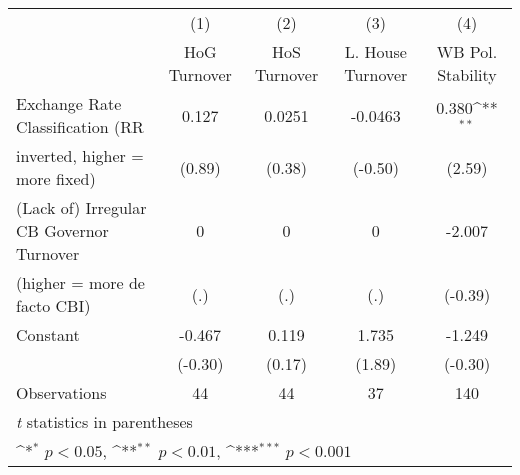 \begin{table}[htbp]\centering
\def\sym#1{\ifmmode^{#1}\else\(^{#1}\)\fi}
\caption{\label{NOhoshogIfivs4}}
\begin{tabular}{l*{4}{c}}
\toprule
                                        &\multicolumn{1}{c}{(1)}&\multicolumn{1}{c}{(2)}&\multicolumn{1}{c}{(3)}&\multicolumn{1}{c}{(4)}\\
                                        &\multicolumn{1}{c}{HoG Turnover}&\multicolumn{1}{c}{HoS Turnover}&\multicolumn{1}{c}{L. House Turnover}&\multicolumn{1}{c}{WB Pol. Stability}\\
\midrule
Exchange Rate Classification (RR        &    0.127         &   0.0251         &  -0.0463         &    0.380\sym{**} \\
inverted, higher = more fixed)          &   (0.89)         &   (0.38)         &  (-0.50)         &   (2.59)         \\
\addlinespace
(Lack of) Irregular CB Governor Turnover&        0         &        0         &        0         &   -2.007         \\
(higher = more de facto CBI)            &      (.)         &      (.)         &      (.)         &  (-0.39)         \\
\addlinespace
Constant                                &   -0.467         &    0.119         &    1.735         &   -1.249         \\
                                        &  (-0.30)         &   (0.17)         &   (1.89)         &  (-0.30)         \\
\midrule
Observations                            &       44         &       44         &       37         &      140         \\
\bottomrule
\multicolumn{5}{l}{\footnotesize \textit{t} statistics in parentheses}\\
\multicolumn{5}{l}{\footnotesize \sym{*} \(p<0.05\), \sym{**} \(p<0.01\), \sym{***} \(p<0.001\)}\\
\end{tabular}
\end{table}
